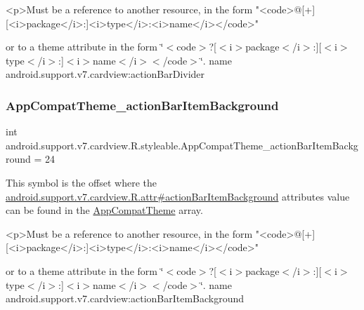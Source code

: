 \begin{DoxyVerb}      <p>Must be a reference to another resource, in the form "<code>@[+][<i>package</i>:]<i>type</i>:<i>name</i></code>"
\end{DoxyVerb}
 or to a theme attribute in the form \char`\"{}$<$code$>$?\mbox{[}$<$i$>$package$<$/i$>$\+:\mbox{]}\mbox{[}$<$i$>$type$<$/i$>$\+:\mbox{]}$<$i$>$name$<$/i$>$$<$/code$>$\char`\"{}.  name android.\+support.\+v7.\+cardview\+:action\+Bar\+Divider \mbox{\label{classandroid_1_1support_1_1v7_1_1cardview_1_1R_1_1styleable_a7d5d06ba7d63aa6454a9674a766d055f}} 
\subsubsection{\texorpdfstring{App\+Compat\+Theme\+\_\+action\+Bar\+Item\+Background}{AppCompatTheme\_actionBarItemBackground}}
{\footnotesize\ttfamily int android.\+support.\+v7.\+cardview.\+R.\+styleable.\+App\+Compat\+Theme\+\_\+action\+Bar\+Item\+Background = 24\hspace{0.3cm}{\ttfamily [static]}}

This symbol is the offset where the \hyperlink{classandroid_1_1support_1_1v7_1_1cardview_1_1R_1_1attr_ae4a87147b65e560b5f3446acbd9a8ad7}{android.\+support.\+v7.\+cardview.\+R.\+attr\#action\+Bar\+Item\+Background} attribute\textquotesingle{}s value can be found in the \hyperlink{classandroid_1_1support_1_1v7_1_1cardview_1_1R_1_1styleable_a52e6f69f954ecc2622d72c0b4d298938}{App\+Compat\+Theme} array.

\begin{DoxyVerb}      <p>Must be a reference to another resource, in the form "<code>@[+][<i>package</i>:]<i>type</i>:<i>name</i></code>"
\end{DoxyVerb}
 or to a theme attribute in the form \char`\"{}$<$code$>$?\mbox{[}$<$i$>$package$<$/i$>$\+:\mbox{]}\mbox{[}$<$i$>$type$<$/i$>$\+:\mbox{]}$<$i$>$name$<$/i$>$$<$/code$>$\char`\"{}.  name android.\+support.\+v7.\+cardview\+:action\+Bar\+Item\+Background \mbox{\label{classandroid_1_1support_1_1v7_1_1cardview_1_1R_1_1styleable_a3963e0347226bf61f80567cb825e8ee2}} 
